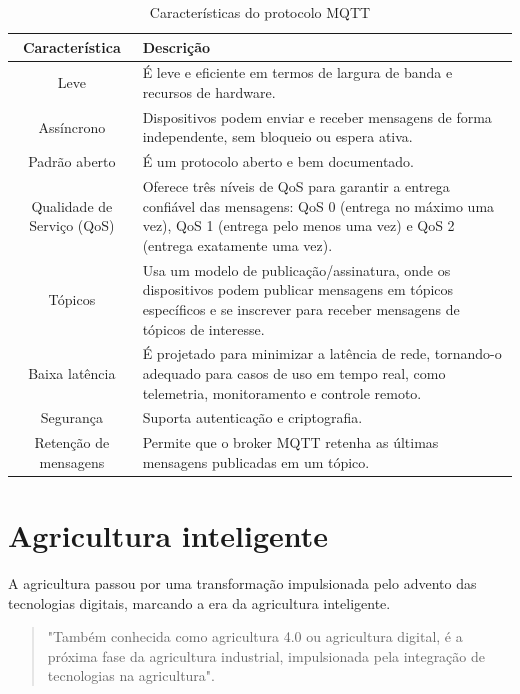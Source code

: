 \begin{table}[!htb]
  \caption{Características do protocolo MQTT} \label{tab:caract_mqtt}
  \begin{tabularx}{\textwidth}{|c|X|} \hline
    \textbf{Característica} & \textbf{Descrição} \\ \hline
    Leve & É leve e eficiente em termos de largura de banda e recursos de hardware. \\ \hline
    Assíncrono & Dispositivos podem enviar e receber mensagens de forma independente, sem bloqueio ou espera ativa. \\ \hline
    Padrão aberto & É um protocolo aberto e bem documentado. \\ \hline
    Qualidade de Serviço (QoS) & Oferece três níveis de QoS para garantir a entrega confiável das mensagens: QoS 0 (entrega no máximo uma vez), QoS 1 (entrega pelo menos uma vez) e QoS 2 (entrega exatamente uma vez). \\ \hline
    Tópicos & Usa um modelo de publicação/assinatura, onde os dispositivos podem publicar mensagens em tópicos específicos e se inscrever para receber mensagens de tópicos de interesse. \\ \hline  
    Baixa latência &  É projetado para minimizar a latência de rede, tornando-o adequado para casos de uso em tempo real, como telemetria, monitoramento e controle remoto. \\ \hline
    Segurança & Suporta autenticação e criptografia. \\ \hline
    Retenção de mensagens & Permite que o broker MQTT retenha as últimas mensagens publicadas em um tópico. \\ \hline  
  \end{tabularx}
\end{table}

\section{Agricultura inteligente}
A agricultura passou por uma transformação impulsionada pelo advento das tecnologias digitais, marcando a era da agricultura inteligente. 

\begin{quote}
  "Também conhecida como agricultura 4.0 ou agricultura digital, é a próxima fase da agricultura industrial, impulsionada pela integração de tecnologias na agricultura". \parencite[{p. 424}]{Gurjeet_smart2022}
\end{quote}

